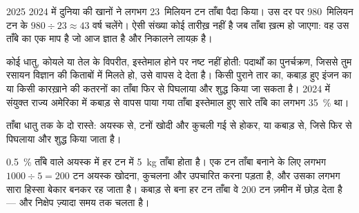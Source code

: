 \begin{dated}{2025}
2024 में दुनिया की खानों ने लगभग 23~मिलियन टन ताँबा पैदा किया। उस दर पर 980~मिलियन टन के
 $980 \div 23
\approx 43$ वर्ष चलेंगे। ऐसी संख्या कोई तारीख़ नहीं है जब ताँबा ख़त्म
हो जाएगा: वह उस ताँबे का एक माप है जो आज ज्ञात है और निकालने लायक़
है।
\end{dated}

कोई धातु, कोयले या तेल के विपरीत, इस्तेमाल होने पर नष्ट नहीं होती: पदार्थों का
पुनर्चक्रण, जिससे तुम रसायन विज्ञान की किताबों में मिलते हो, उसे वापस दे देता है। किसी पुराने
तार का, कबाड़ हुए इंजन का या किसी कारख़ाने की कतरनों का ताँबा फिर से पिघलाया और शुद्ध किया
जा सकता है। 2024 में संयुक्त राज्य अमेरिका में कबाड़ से वापस पाया गया ताँबा इस्तेमाल हुए
सारे ताँबे का लगभग \qty{35}{\%}
था।

\begin{omfigure}

{\small ताँबा धातु तक के दो रास्ते: अयस्क से, टनों खोदी और कुचली गई  से होकर, या
कबाड़ से, जिसे फिर से पिघलाया और शुद्ध किया जाता है।}
\end{omfigure}

\begin{example}[वह चट्टान जो पुनर्चक्रण बचाता है]\label{ex:g9:earth-resources:recycling}
\qty{0.5}{\%} ताँबे वाले अयस्क में हर टन  में \qty{5}{kg} ताँबा होता है। एक टन ताँबा
बनाने के लिए लगभग $1000 \div 5 = 200$ टन अयस्क खोदना, कुचलना और उपचारित करना पड़ता है,
और उसका लगभग सारा हिस्सा बेकार  बनकर रह जाता है। कबाड़ से बना हर टन ताँबा वे 200
टन  ज़मीन में छोड़ देता है --- और निक्षेप ज़्यादा समय तक चलता
है।
\end{example}


